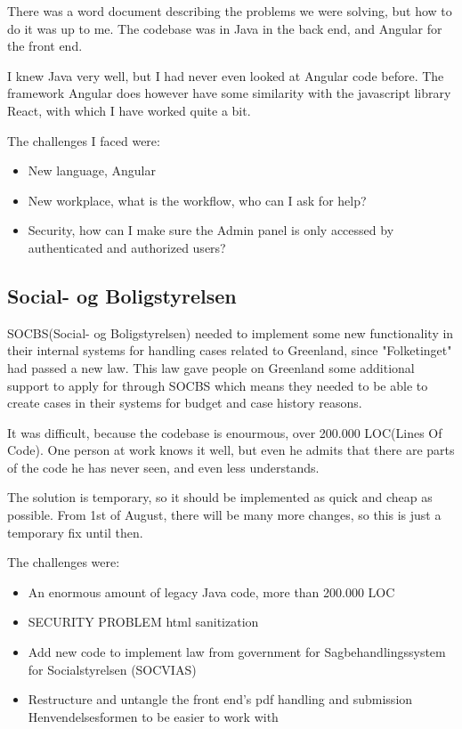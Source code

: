 \documentclass[../main.tex]{subfiles}
\begin{document}
There was a word document describing the problems we were solving, but how to do it was up to me. The codebase was in Java in the back end, and Angular for the front end. 

I knew Java very well, but I had never even looked at Angular code before. The framework Angular does however have some similarity with the javascript library React, with which I have worked quite a bit.


The challenges I faced were:
\begin{itemize}
    \item New language, Angular
    \item New workplace, what is the workflow, who can I ask for help?
    \item Security, how can I make sure the Admin panel is only accessed by authenticated and authorized users?
\end{itemize}



\subsection{Social- og Boligstyrelsen}
SOCBS(Social- og Boligstyrelsen) needed to implement some new functionality in their internal systems for handling cases related to Greenland, since "Folketinget" had passed a new law. This law gave people on Greenland some additional support to apply for through SOCBS which means they needed to be able to create cases in their systems for budget and case history reasons.

It was difficult, because the codebase is enourmous, over 200.000 LOC(Lines Of Code). One person at work knows it well, but even he admits that there are parts of the code he has never seen, and even less understands.

The solution is temporary, so it should be implemented as quick and cheap as possible. From 1st of August, there will be many more changes, so this is just a temporary fix until then.




The challenges were:
\begin{itemize}
    \item An enormous amount of legacy Java code, more than 200.000 LOC
    \item SECURITY PROBLEM html sanitization 
    \item Add new code to implement law from government for Sagbehandlingssystem for Socialstyrelsen (SOCVIAS) 
    \item Restructure and untangle the front end's pdf handling and submission Henvendelsesformen to be easier to work with
\end{itemize}
\end{document}
